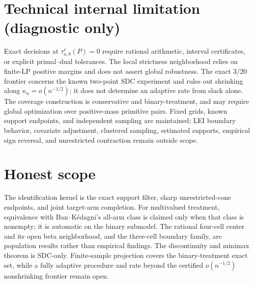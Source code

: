 \documentclass{article}
\begin{document}
\section*{Technical internal limitation (diagnostic only)}

Exact decisions at \(\tau_{a,b}^r(P)=0\) require rational arithmetic, interval certificates, or explicit primal--dual tolerances. The local strictness neighborhood relies on finite-LP positive margins and does not assert global robustness. The exact \(3/20\) frontier concerns the known two-point SDC experiment and rules out shrinking along \(\kappa_n=o(n^{-1/2})\); it does not determine an adaptive rate from slack alone. The coverage construction is conservative and binary-treatment, and may require global optimization over positive-mass primitive pairs. Fixed grids, known support endpoints, and independent sampling are maintained; LEI boundary behavior, covariate adjustment, clustered sampling, estimated supports, empirical sign reversal, and unrestricted contraction remain outside scope.

\section{Honest scope}

The identification kernel is the exact support filter, sharp unrestricted-cone endpoints, and joint target-arm completion. For multivalued treatment, equivalence with Ban--Kédagni's all-arm class is claimed only when that class is nonempty; it is automatic on the binary submodel. The rational four-cell center and its open beta neighborhood, and the three-cell boundary family, are population results rather than empirical findings. The discontinuity and minimax theorem is SDC-only. Finite-sample projection covers the binary-treatment exact set, while a fully adaptive procedure and rate beyond the certified \(o(n^{-1/2})\) nonshrinking frontier remain open.
\end{document}
